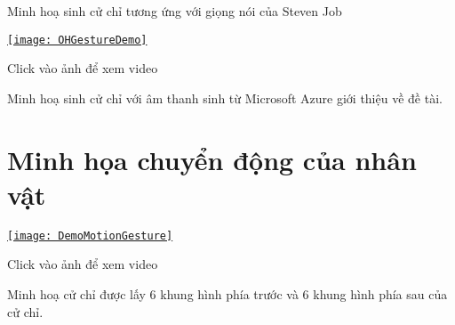 Minh hoạ sinh cử chỉ tương ứng với giọng nói của Steven Job


{
	\begin{center}
		\centering
		\href{https://youtu.be/yLwXdm7UgPE}{%
			\texttt{[image: OHGestureDemo]}}
		
		{\tiny Click vào ảnh để xem video}
	\end{center}
}

Minh hoạ sinh cử chỉ với âm thanh sinh từ Microsoft Azure giới thiệu về đề tài.

\section{Minh họa chuyển động của nhân vật}

\begin{center}
{
	\centering
	\href{https://www.youtube.com/watch?v=9IIIZP3EJLg}{%
	\texttt{[image: DemoMotionGesture]}}
	
	{\tiny Click vào ảnh để xem video}
}
\end{center}
Minh hoạ cử chỉ được lấy 6 khung hình phía trước và 6 khung hình phía sau của cử chỉ.